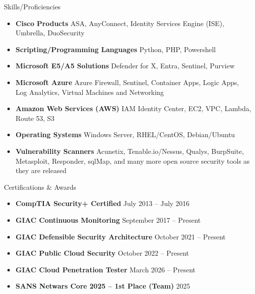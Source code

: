 \documentclass[]{mcdowellcv}
\begin{document}
\begin{cvsection}{Skills/Proficiencies}
    \begin{cvsubsection}{}{}{}
        \begin{itemize}
            \item \textbf{Cisco Products}  ASA, AnyConnect, Identity Services Engine (ISE), Umbrella, DuoSecurity
            \item \textbf{Scripting/Programming Languages}  Python, PHP, Powershell
            \item \textbf{Microsoft E5/A5 Solutions}  Defender for X, Entra, Sentinel, Purview
            \item \textbf{Microsoft Azure} Azure Firewall, Sentinel, Container Apps, Logic Apps, Log Analytics, Virtual Machines and Networking
            \item \textbf{Amazon Web Services (AWS)} IAM Identity Center, EC2, VPC, Lambda, Route 53, S3 
            \item \textbf{Operating Systems} Windows Server, RHEL/CentOS, Debian/Ubuntu
            \item \textbf{Vulnerability Scanners}  Acunetix, Tenable.io/Nessus, Qualys, BurpSuite, Metasploit, Responder, sqlMap, and many more open source security tools as they are released
        \end{itemize}
    \end{cvsubsection}
\end{cvsection}

\begin{cvsection}{Certifications \& Awards}
	\begin{cvsubsection}{}{}{}
		\begin{itemize}
			\setlength\itemsep{3pt}
			\item \textbf{CompTIA Security+ Certified} \hfill July 2013 – July 2016
			\item \textbf{GIAC Continuous Monitoring} \hfill  September 2017 – Present
            \item \textbf{GIAC Defensible Security Architecture} \hfill  October 2021 – Present
            \item \textbf{GIAC Public Cloud Security} \hfill  October 2022 – Present
			\item \textbf{GIAC Cloud Penetration Tester} \hfill  March 2026 – Present
			\item \textbf{SANS Netwars Core 2025 -- 1st Place (Team)} \hfill 2025
		\end{itemize}
	\end{cvsubsection}
\end{cvsection}

\customfooter
\end{document}
